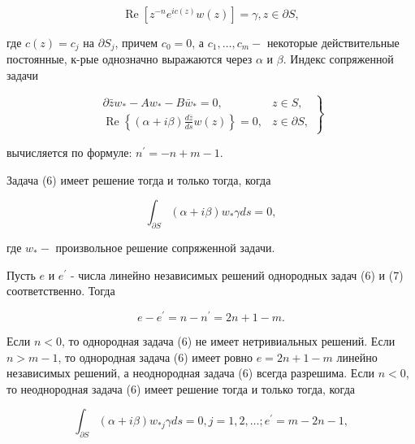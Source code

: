 \documentclass[10pt]{article}
\begin{document}
\[

\operatorname{Re}\left[z^{-n} e^{i c(z)} w(z)\right]=\gamma, z \in \partial S,

\]



где $c(z)=c_{j}$ на $\partial S_{j}$, причем $c_{0}=0$, а $c_{1}, \ldots, c_{m}-$ некоторые действительные постоянные, к-рые однозначно выражаются через $\alpha$ и $\beta$. Индекс сопряженной задачи



\[

\left.\begin{array}{cc}

\partial \bar{z} w_{*}-A w_{*}-B \bar{w}_{*}=0, & z \in S, \\

\operatorname{Re}\left\{(\alpha+i \beta) \frac{d \bar{z}}{d s} w(z)\right\}=0, & z \in \partial S,

\end{array}\right\}

\]



вычисляется по формуле: $n^{\prime}=-n+m-1$.



Задача (6) имеет решение тогда и только тогда, когда



\[

\int_{\partial S}(\alpha+i \beta) w_{*} \gamma d s=0,

\]



где $w_{*}-$ произвольное решение сопряженной задачи.



Пусть $e$ и $e^{\prime}$ - числа линейно независимых решений однородных задач (6) и (7) соответственно. Тогда



\[

e-e^{\prime}=n-n^{\prime}=2 n+1-m .

\]



Если $n<0$, то однородная задача (6) не имеет нетривиальных решений. Если $n>m-1$, то однородная задача (6) имеет ровно $e=2 n+1-m$ линейно независимых решений, а неоднородная задача (6) всегда разрешима. Если $n<0$, то неоднородная задача (6) имеет решение тогда и только тогда, когда



\[

\int_{\partial S}(\alpha+i \beta) w_{* j} \gamma d s=0, j=1,2, \ldots ; e^{\prime}=m-2 n-1,

\]
\end{document}
